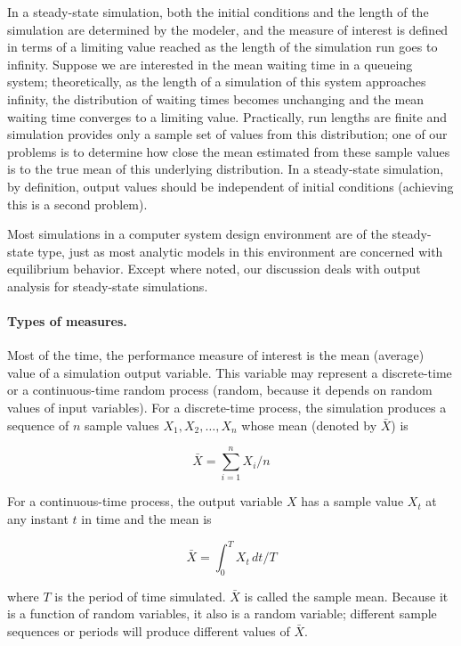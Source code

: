 In a steady-state simulation, both the initial conditions and the length of the
simulation are determined by the modeler, and the measure of interest is
defined in terms of a limiting value reached as the length of the simulation
run goes to infinity. Suppose we are interested in the mean waiting time in a
queueing system; theoretically, as the length of a simulation of this system
approaches infinity, the distribution of waiting times becomes unchanging and
the mean waiting time converges to a limiting value. Practically, run lengths
are finite and simulation provides only a sample set of values from this
distribution; one of our problems is to determine how close the mean estimated
from these sample values is to the true mean of this underlying distribution.
In a steady-state simulation, by definition, output values should be
independent of initial conditions (achieving this is a second problem).

Most simulations in a computer system design environment are of the steady-
state type, just as most analytic models in this environment are concerned with
equilibrium behavior. Except where noted, our discussion deals with output
analysis for steady-state simulations.

\paragraph{Types of measures.}
Most of the time, the performance measure of interest is the mean (average)
value of a simulation output variable. This variable may represent a
discrete-time or a continuous-time random process (random, because it depends
on random values of input variables). For a discrete-time process, the
simulation produces a sequence of $n$ sample values $X_1, X_2, \ldots, X_n$
whose mean (denoted by $\bar{X}$) is

\begin{equation}
\bar{X} = \sum_{i=1}^{n} X_i / n
\label{eq:output-mean-discrete}
\end{equation}

For a continuous-time process, the output variable $X$ has a sample value $X_t$
at any instant $t$ in time and the mean is

\begin{equation}
\bar{X} = \int_{0}^{T} X_t \, dt / T
\label{eq:output-mean-continuous}
\end{equation}

where $T$ is the period of time simulated. $\bar{X}$ is called the sample mean.
Because it is a function of random variables, it also is a random variable;
different sample sequences or periods will produce different values of
$\bar{X}$.

